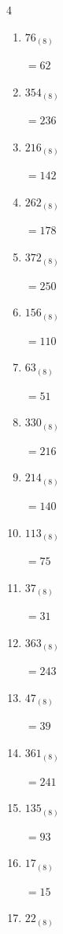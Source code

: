 \begin{multicols}{4}
\begin{enumerate}
  \item $76_{(8)}$

        $=62$

  \item $354_{(8)}$

        $=236$

  \item $216_{(8)}$

        $=142$

  \item $262_{(8)}$

        $=178$

  \item $372_{(8)}$

        $=250$

  \item $156_{(8)}$

        $=110$

  \item $63_{(8)}$

        $=51$

  \item $330_{(8)}$

        $=216$

  \item $214_{(8)}$

        $=140$

  \item $113_{(8)}$

        $=75$

  \item $37_{(8)}$

        $=31$

  \item $363_{(8)}$

        $=243$

  \item $47_{(8)}$

        $=39$

  \item $361_{(8)}$

        $=241$

\columnbreak %

  \item $135_{(8)}$

        $=93$

  \item $17_{(8)}$

        $=15$

  \item $22_{(8)}$


\end{enumerate}
\end{multicols}
